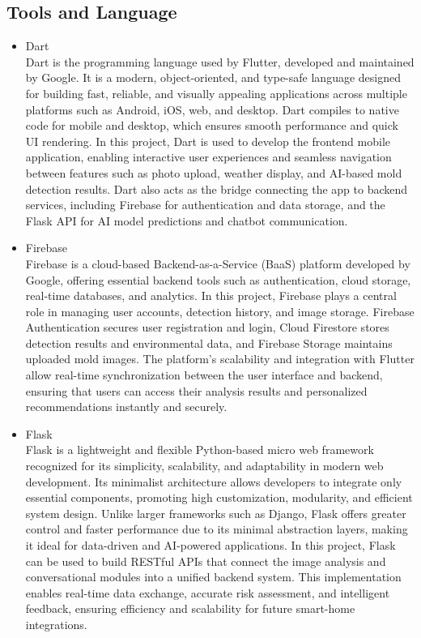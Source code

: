 \documentclass[conference]{IEEEtran}
\begin{document}
\subsection{Tools and Language}
    \begin{itemize}
        \item Dart \\
        Dart is the programming language used by Flutter, developed and maintained by Google. It is a modern, object-oriented, and type-safe language designed for building fast, reliable, and visually appealing applications across multiple platforms such as Android, iOS, web, and desktop. Dart compiles to native code for mobile and desktop, which ensures smooth performance and quick UI rendering. In this project, Dart is used to develop the frontend mobile application, enabling interactive user experiences and seamless navigation between features such as photo upload, weather display, and AI-based mold detection results. Dart also acts as the bridge connecting the app to backend services, including Firebase for authentication and data storage, and the Flask API for AI model predictions and chatbot communication.\\
        
        \item Firebase \\
        Firebase is a cloud-based Backend-as-a-Service (BaaS) platform developed by Google, offering essential backend tools such as authentication, cloud storage, real-time databases, and analytics. In this project, Firebase plays a central role in managing user accounts, detection history, and image storage. Firebase Authentication secures user registration and login, Cloud Firestore stores detection results and environmental data, and Firebase Storage maintains uploaded mold images. The platform’s scalability and integration with Flutter allow real-time synchronization between the user interface and backend, ensuring that users can access their analysis results and personalized recommendations instantly and securely. \\
        
        \item Flask \\
        Flask is a lightweight and flexible Python-based micro web framework recognized for its simplicity, scalability, and adaptability in modern web development. Its minimalist architecture allows developers to integrate only essential components, promoting high customization, modularity, and efficient system design. Unlike larger frameworks such as Django, Flask offers greater control and faster performance due to its minimal abstraction layers, making it ideal for data-driven and AI-powered applications. In this project, Flask can be used to build RESTful APIs that connect the image analysis and conversational modules into a unified backend system. This implementation enables real-time data exchange, accurate risk assessment, and intelligent feedback, ensuring efficiency and scalability for future smart-home integrations. \\


\end{itemize}
\end{document}
